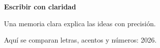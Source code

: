 \documentclass{estilo/memoria}
\begin{document}
\pagestyle{empty}
\noindent\begin{minipage}{120mm}
{\fontsize{18}{22}\selectfont\bfseries Escribir con claridad\par}
\vspace{3mm}
{\fontsize{12}{16}\selectfont Una memoria clara explica las ideas con precisión.\par
Aquí se comparan letras, acentos y números: 2026.\par}
\end{minipage}
\end{document}
